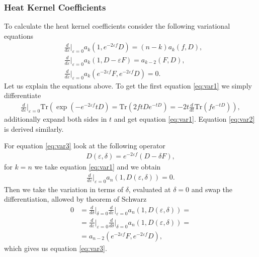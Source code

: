 \subsubsection{Heat Kernel Coefficients}
To calculate the heat kernel coefficients consider the following variational
equations
\begin{align}
    &\frac{d}{d\varepsilon}\bigg|_{\varepsilon=0}a_k(1, e^{-2\varepsilon f}D) =
    (n-k) a_k(f, D),\label{eq:var1}\\
    &\frac{d}{d\varepsilon}\bigg|_{\varepsilon=0}a_k(1, D-\varepsilon F) =
    a_{k-2}(F,D),\label{eq:var2}\\
    &\frac{d}{d\varepsilon}\bigg|_{\varepsilon=0}a_k(e^{-2\varepsilon f}F,
    e^{-2\varepsilon f}D) =
    0\label{eq:var3}.
\end{align}
Let us explain the equations above. To get the first equation \eqref{eq:var1}
we simply differentiate
\begin{align}
    \frac{d}{d\varepsilon}\bigg|_{\varepsilon=0} \text{Tr}(\exp(-e^{-2\varepsilon
    f}tD) = \text{Tr}(2ftDe^{-tD}) = -2t\frac{d}{dt}\text{Tr}(fe^{-tD})),
\end{align}
additionally expand both sides in $t$ and get equation \eqref{eq:var1}. Equation
\eqref{eq:var2} is derived similarly.

For equation \eqref{eq:var3} look at the following operator
\begin{align}
    D(\varepsilon,\delta) = e^{-2\varepsilon f}(D-\delta F),
\end{align}
for $k=n$ we take equation \eqref{eq:var1} and we obtain
\begin{align}
    \frac{d}{d\varepsilon}\bigg|_{\varepsilon=0}a_n(1,D(\varepsilon,\delta))
    =0.
\end{align}
Then we take the variation in terms of $\delta$, evaluated at $\delta =0$ and
swap the differentiation, allowed by theorem of Schwarz
\begin{align}
    0 &=
    \frac{d}{d\delta}\bigg|_{\delta=0}\frac{d}{d\varepsilon}\bigg|_{\varepsilon=0}a_n(1,
    D(\varepsilon,\delta)) =\nonumber\\
      &=\frac{d}{d\varepsilon}\bigg|_{\varepsilon=0}\frac{d}{d\delta}\bigg|_{\delta=0}a_n(1,
    D(\varepsilon,\delta)) =\nonumber\\
      &=a_{n-2} ( e^{-2\varepsilon f}F, e^{-2\varepsilon f}D),
\end{align}
which gives us equation \eqref{eq:var3}.

